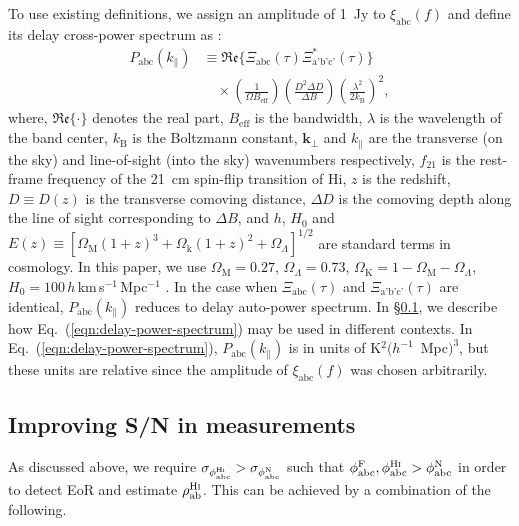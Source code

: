 \documentclass[
reprint,
superscriptaddress,
amsmath,
amssymb,
aps,
]{revtex4-1}
\begin{document}
To use existing definitions, we assign an amplitude of 1~Jy to $\xi_\textrm{abc}(f)$ and define its delay cross-power spectrum as \cite{par12a,thy15a}:
\begin{align}
  P_\textrm{abc}(k_\parallel) &\equiv \mathfrak{Re}\bigg\{\Xi_\textrm{abc}(\tau)\Xi_\textrm{a'b'c'}^*(\tau)\bigg\} \nonumber\\
  &\quad \times \left(\frac{1}{\Omega B_\textrm{eff}}\right)\left(\frac{D^2\Delta D}{\Delta B}\right)\left(\frac{\lambda^2}{2k_\textrm{B}}\right)^2, \label{eqn:delay-power-spectrum}
\end{align}
where, $\mathfrak{Re}\{\cdot\}$ denotes the real part, $B_\textrm{eff}$ is the bandwidth, $\lambda$ is the wavelength of the band center, $k_\textrm{B}$ is the Boltzmann constant, $\boldsymbol{k}_\perp$ and $k_\parallel$ are the transverse (on the sky) and line-of-sight (into the sky) wavenumbers respectively, $f_{21}$ is the rest-frame frequency of the 21~cm spin-flip transition of H{\sc i}, $z$ is the redshift, $D\equiv D(z)$ is the transverse comoving distance, $\Delta D$ is the comoving depth along the line of sight corresponding to $\Delta B$, and $h$, $H_0$ and $E(z)\equiv [\Omega_\textrm{M}(1+z)^3+\Omega_\textrm{k}(1+z)^2+\Omega_\Lambda]^{1/2}$ are standard terms in cosmology. In this paper, we use $\Omega_\textrm{M}=0.27$, $\Omega_\Lambda=0.73$, $\Omega_\textrm{K}=1-\Omega_\textrm{M}-\Omega_\Lambda$, $H_0=100\,h\,$km$\,$s$^{-1}\,$Mpc$^{-1}$ \cite{wmap9cosmo}. In the case when $\Xi_\textrm{abc}(\tau)$ and $\Xi_\textrm{a'b'c'}(\tau)$ are identical, $P_\textrm{abc}(k_\parallel)$ reduces to delay auto-power spectrum. In \S\ref{sec:averaging}, we describe how Eq.~(\ref{eqn:delay-power-spectrum}) may be used in different contexts. In Eq.~(\ref{eqn:delay-power-spectrum}), $P_\textrm{abc}(k_\parallel)$ is in units of K$^2 (h^{-1}$~Mpc$)^3$, but these units are relative since the amplitude of $\xi_\textrm{abc}(f)$ was chosen arbitrarily. 

\subsection{Improving S/N in measurements}\label{sec:averaging}

As discussed above, we require $\sigma_{\phi_\textrm{abc}^\textrm{H{\sc i}}} > \sigma_{\phi_\textrm{abc}^\textrm{N}}$ such that $\phi_\textrm{abc}^\textrm{F}, \phi_\textrm{abc}^\textrm{H{\sc i}} > \phi_\textrm{abc}^\textrm{N}$ in order to detect EoR and estimate $\rho_\textrm{ab}^\textrm{H{\sc i}}$. This can be achieved by a combination of the following.
\end{document}

